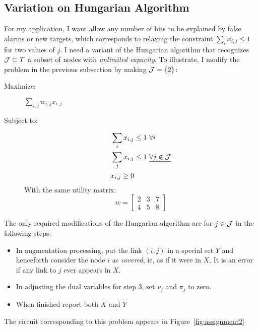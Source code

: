 \documentclass[12pt]{article}
\begin{document}
\subsection{Variation on Hungarian Algorithm}
\label{sec:variation}

For my application, I want allow any number of hits to be explained by
false alarms or new targets, which corresponds to relaxing the
constraint $\sum_i x_{i,j} \leq 1$ for two values of $j$.  I need a
variant of the Hungarian algorithm that recognizes ${\cal J} \subset
T$ a subset of nodes with \emph{unlimited capacity}.  To illustrate, I
modify the problem in the previous subsection by making ${\cal J} =
\left\{2\right\}$:
\begin{description}
\item[Maximize:] $\sum_{i,j} w_{i,j} x_{i,j}$
\item[Subject to:]
  \begin{align*}
    \sum_i x_{i,j} &\leq 1 ~\forall i\\
    \sum_j x_{i,j} &\leq 1  ~\underline{\forall j \notin {\cal J}} \\
    x_{i,j} \geq 0
  \end{align*}
With the same utility matrix:
\begin{equation*}
  w =
  \begin{bmatrix}
    2 & 3 & 7 \\
    4 & 5 & 8
  \end{bmatrix}
\end{equation*}
\end{description}
The only required modifications of the Hungarian algorithm are for
$j\in {\cal J}$ in the following steps:
\begin{itemize}
\item In augmentation processing, put the link $(i,j)$ in a special
  set $Y$ and henceforth consider the node $i$ as \emph{covered}, ie,
  as if it were in $X$.  It is an error if any link to $j$ ever
  appears in $X$.
\item In adjusting the dual variables for step 3, set $v_j$ and
  $\pi_j$ to zero.
\item When finished report both $X$ and $Y$
\end{itemize}

The circuit corresponding to this problem appears in
Figure~\ref{fig:assignment2}
\begin{figure*}
  \centering
  \caption{Circuit equivalent of the assignment problem with no
    restriction on the number of $i$ nodes assigned to node $j=0$.}
  \label{fig:assignment2}
\end{figure*}
\end{document}
